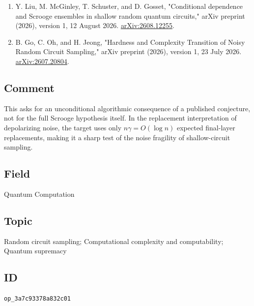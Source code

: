 \begin{enumerate}[label={},leftmargin=4.8em,labelsep=0.5em]
  \footnotesize
  \item[\textup{[Liu26]}]\label{ref:3a7c-liu26}
  Y. Liu, M. McGinley, T. Schuster, and D. Gosset, "Conditional dependence and Scrooge ensembles in shallow random quantum circuits," arXiv preprint (2026), version 1, 12 August 2026. \href{https://arxiv.org/abs/2608.12255}{arXiv:2608.12255}.

  \item[\textup{[Go26]}]\label{ref:3a7c-go26}
  B. Go, C. Oh, and H. Jeong, "Hardness and Complexity Transition of Noisy Random Circuit Sampling," arXiv preprint (2026), version 1, 23 July 2026. \href{https://arxiv.org/abs/2607.20804}{arXiv:2607.20804}.
\end{enumerate}

\subsection*{Comment}

This asks for an unconditional algorithmic consequence of a published conjecture, not for the full Scrooge hypothesis itself. In the replacement interpretation of depolarizing noise, the target uses only $n\gamma=O(\log n)$ expected final-layer replacements, making it a sharp test of the noise fragility of shallow-circuit sampling.

\subsection*{Field}

Quantum Computation

\subsection*{Topic}

Random circuit sampling; Computational complexity and computability; Quantum supremacy

\subsection*{ID}

\texttt{op\_3a7c93378a832c01}
